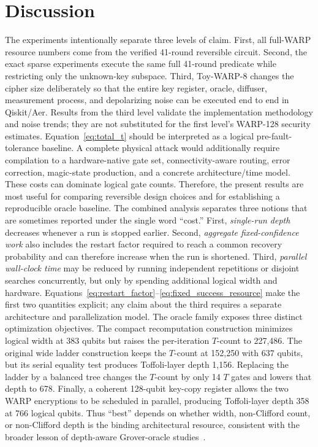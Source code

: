 \documentclass[pdflatex,sn-nature]{sn-jnl}
\theoremstyle{thmstyleone}
\theoremstyle{thmstyletwo}
\begin{document}
\section{Discussion}
The experiments intentionally separate three levels of claim.  First, all full-WARP resource numbers come from the verified 41-round reversible circuit.  Second, the exact sparse experiments execute the same full 41-round predicate while restricting only the unknown-key subspace.  Third, Toy-WARP-8 changes the cipher size deliberately so that the entire key register, oracle, diffuser, measurement process, and depolarizing noise can be executed end to end in Qiskit/Aer.  Results from the third level validate the implementation methodology and noise trends; they are not substituted for the first level's WARP-128 security estimates.
Equation~\eqref{eq:total_t} should be interpreted as a logical pre-fault-tolerance baseline. A complete physical attack would additionally require compilation to a hardware-native gate set, connectivity-aware routing, error correction, magic-state production, and a concrete architecture/time model. These costs can dominate logical gate counts. Therefore, the present results are most useful for comparing reversible design choices and for establishing a reproducible oracle baseline.
The combined analysis separates three notions that are sometimes reported under the single word ``cost.''  First, \emph{single-run depth} decreases whenever a run is stopped earlier.  Second, \emph{aggregate fixed-confidence work} also includes the restart factor required to reach a common recovery probability and can therefore increase when the run is shortened.  Third, \emph{parallel wall-clock time} may be reduced by running independent repetitions or disjoint searches concurrently, but only by spending additional logical width and hardware.  Equations~\eqref{eq:restart_factor}--\eqref{eq:fixed_success_resource} make the first two quantities explicit; any claim about the third requires a separate architecture and parallelization model.
The oracle family exposes three distinct optimization objectives. The compact recomputation construction minimizes logical width at 383 qubits but raises the per-iteration $T$-count to 227,486. The original wide ladder construction keeps the $T$-count at 152,250 with 637 qubits, but its serial equality test produces Toffoli-layer depth 1,156. Replacing the ladder by a balanced tree changes the $T$-count by only 14 $T$ gates and lowers that depth to 678. Finally, a coherent 128-qubit key-copy register allows the two WARP encryptions to be scheduled in parallel, producing Toffoli-layer depth 358 at 766 logical qubits. Thus ``best'' depends on whether width, non-Clifford count, or non-Clifford depth is the binding architectural resource, consistent with the broader lesson of depth-aware Grover-oracle studies~\cite{Jaques2020,Rahman2022}.
\end{document}
